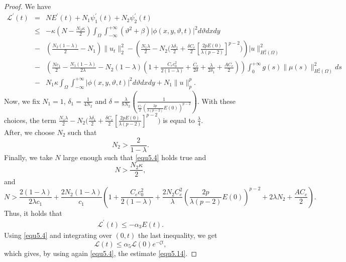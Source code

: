 \documentclass[12pt]{article}
\numberwithin{equation}{section}
\begin{document}
\begin{proof}
We have
\begin{eqnarray*}
\mathcal{L}^{\prime}(t)&=& N E^{\prime}(t) + N_{1}\psi^{\prime}_{1}(t) + N_{2}\psi^{\prime}_{2}(t)\nonumber\\
&\le& -\kappa \left(N-\frac{N_2\kappa}{2}\right) \int_{\Omega}\int_{-\infty}^{+\infty}
        (\vartheta^{2}+\beta)|\phi(x,y,\vartheta,t)|^2 d\vartheta dx dy \nonumber\\
&-&\left(\frac{N_2(1-\lambda)}{2}- N_{1}\right)\|u_{t}\|_{2}^{2}- \left(\frac{N_{1}\lambda}{2}-N_2\Big(\frac{\lambda \delta_1}{2}+\frac{\delta C_e }{2}\left[\frac{2 p E(0)}{\lambda(p-2) }\right]^{p-2}\Big)\right)|u\|_{H_{*}^{2}(\Omega)}^{2}\nonumber\\
&-&\left(\frac{Nc_1}{2}-\frac{N_1 (1-\lambda)}{2\lambda}-N_2 (1-\lambda)\left(1+\frac{C_e c_0^2 }{2(1-\lambda)}+\frac{C_e}{2\delta}+\frac{\lambda}{2\delta_1}+\frac{AC_e}{2}\right) \right)\int_{0}^{+\infty} g(s)\|\mu(s)\|_{H_{*}^{2}(\Omega)}^{2} ds\nonumber\\
&-&  N_1\kappa\int_{\Omega}\int_{-\infty}^{+\infty}
        |\phi(x,y,\vartheta,t)|^2 d\vartheta dx dy +N_{1}\|u\|_{p}^{p}.
\end{eqnarray*}
Now, we fix $N_1=1$, $\delta_{1} = \frac{1}{4N_{2}}$ and $\delta = \frac{\lambda}{8N_{2}}\left(\frac{1}{\frac{C_{e}}{2}\left( \frac{2p}{\lambda(p-2)}E(0) \right)^{p-2}}\right)$. With these choices, the term $\frac{N_{1}\lambda}{2}-N_2\Big(\frac{\lambda \delta_1}{2}+\frac{\delta C_e }{2}\left[\frac{2 p E(0)}{\lambda(p-2) }\right]^{p-2}\Big)$ is equal to $\frac{\lambda}{4}$.\\
After, we choose $N_{2}$  such that
$$ N_{2}> \frac{2}{1-\lambda}.$$
Finally, we take $N$ large enough such that \eqref{equ5.4} holds true and
$$N>\frac{N_2\kappa}{2},$$
and
$$N>\frac{2 (1-\lambda)}{2\lambda c_1}+\frac{2N_2 (1-\lambda)}{c_1}\left(1+\frac{C_e c_0^2 }{2(1-\lambda)}+\frac{2N_2C^2_e}{\lambda} \left(\frac{2p}{\lambda(p-2)}E(0) \right)^{p-2}+2\lambda N_2+\frac{AC_e}{2}\right).$$
Thus, it holds that
\begin{eqnarray*}
\mathcal{L}^{\prime}(t)\leq -\alpha_3 E(t).
\end{eqnarray*}
Using \eqref{equ5.4} and integrating over $(0,t)$ the last inequality, we get
$$\mathcal{L}(t)\leq \alpha_5 \mathcal{L}(0) e^{-\zeta t},$$
which gives, by using again \eqref{equ5.4}, the estimate \eqref{equ5.14}.
\end{proof}
\end{document}
